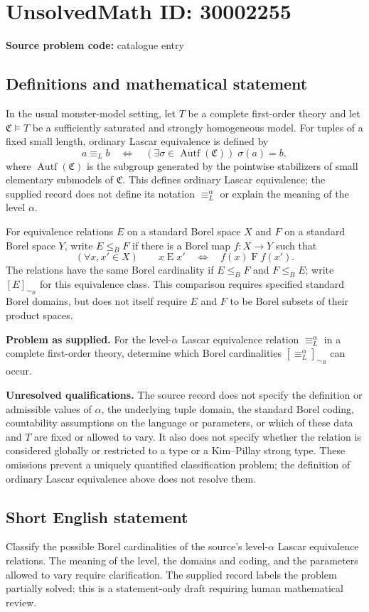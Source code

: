 \documentclass[11pt]{article}
\begin{document}
\section*{UnsolvedMath ID: 30002255}
\textbf{Source problem code:} catalogue entry
\subsection{Definitions and mathematical statement}
In the usual monster-model setting, let \(T\) be a complete first-order theory and let \(\mathfrak C\models T\) be a sufficiently saturated and strongly homogeneous model. For tuples of a fixed small length, ordinary Lascar equivalence is defined by
\[
 a\equiv_L b
 \quad\Longleftrightarrow\quad
 (\exists\sigma\in\operatorname{Autf}(\mathfrak C))\;\sigma(a)=b,
\]
where \(\operatorname{Autf}(\mathfrak C)\) is the subgroup generated by the pointwise stabilizers of small elementary submodels of \(\mathfrak C\). This defines ordinary Lascar equivalence; the supplied record does not define its notation \(\equiv_L^\alpha\) or explain the meaning of the level \(\alpha\).

For equivalence relations \(E\) on a standard Borel space \(X\) and \(F\) on a standard Borel space \(Y\), write \(E\leq_B F\) if there is a Borel map \(f:X\to Y\) such that
\[
 (\forall x,x'\in X)\qquad
 x\mathrel{E}x'\quad\Longleftrightarrow\quad f(x)\mathrel{F}f(x').
\]
The relations have the same Borel cardinality if \(E\leq_B F\) and \(F\leq_B E\); write \([E]_{\sim_B}\) for this equivalence class. This comparison requires specified standard Borel domains, but does not itself require \(E\) and \(F\) to be Borel subsets of their product spaces.

\textbf{Problem as supplied.} For the level-\(\alpha\) Lascar equivalence relation \(\equiv_L^\alpha\) in a complete first-order theory, determine which Borel cardinalities \([\equiv_L^\alpha]_{\sim_B}\) can occur.

\textbf{Unresolved qualifications.} The source record does not specify the definition or admissible values of \(\alpha\), the underlying tuple domain, the standard Borel coding, countability assumptions on the language or parameters, or which of these data and \(T\) are fixed or allowed to vary. It also does not specify whether the relation is considered globally or restricted to a type or a Kim--Pillay strong type. These omissions prevent a uniquely quantified classification problem; the definition of ordinary Lascar equivalence above does not resolve them.
\subsection{Short English statement}
Classify the possible Borel cardinalities of the source's level-\(\alpha\) Lascar equivalence relations. The meaning of the level, the domains and coding, and the parameters allowed to vary require clarification. The supplied record labels the problem partially solved; this is a statement-only draft requiring human mathematical review.
\end{document}
